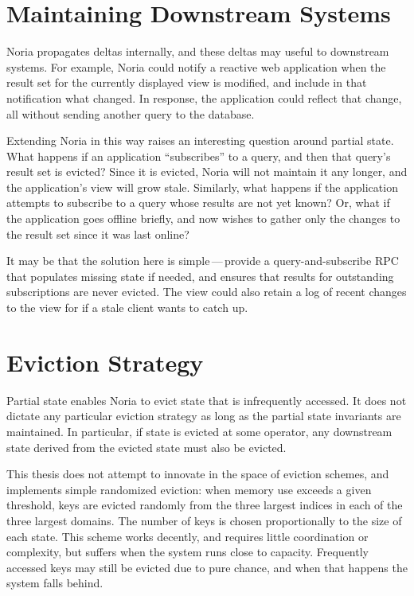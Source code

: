 \section{Maintaining Downstream Systems}

Noria propagates deltas internally, and these deltas may useful to downstream
systems. For example, Noria could notify a reactive web application when the
result set for the currently displayed view is modified, and include in that
notification what changed. In response, the application could reflect that
change, all without sending another query to the database.

Extending Noria in this way raises an interesting question around partial state.
What happens if an application ``subscribes'' to a query, and then that query's
result set is evicted? Since it is evicted, Noria will not maintain it any
longer, and the application's view will grow stale. Similarly, what happens if
the application attempts to subscribe to a query whose results are not yet
known? Or, what if the application goes offline briefly, and now wishes to
gather only the changes to the result set since it was last online?

It may be that the solution here is simple\,---\,provide a query-and-subscribe
RPC that populates missing state if needed, and ensures that results for
outstanding subscriptions are never evicted. The view could also retain a log of
recent changes to the view for if a stale client wants to catch up.

\section{Eviction Strategy}

Partial state enables Noria to evict state that is infrequently accessed. It
does not dictate any particular eviction strategy as long as the partial state
invariants are maintained. In particular, if state is evicted at some operator,
any downstream state derived from the evicted state must also be evicted.

This thesis does not attempt to innovate in the space of eviction schemes, and
implements simple randomized eviction: when memory use exceeds a given
threshold, keys are evicted randomly from the three largest indices in each of
the three largest domains. The number of keys is chosen proportionally to the
size of each state. This scheme works decently, and requires little coordination
or complexity, but suffers when the system runs close to capacity. Frequently
accessed keys may still be evicted due to pure chance, and when that happens the
system falls behind.

